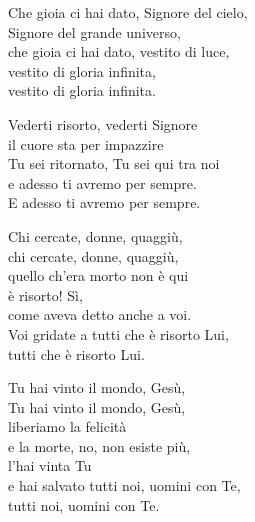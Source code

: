 \documentclass[11pt]{book}
\begin{document}
\congedo

\settowidth{\versewidth}{Che gioia ci hai dato, Signore del cielo,}
\begin{canzone}%
Che gioia ci hai dato, Signore del cielo,\\
Signore del grande universo,\\
che gioia ci hai dato, vestito di luce,\\
vestito di gloria infinita,\\
vestito di gloria infinita.

Vederti risorto, vederti Signore\\
il cuore sta per impazzire\\
Tu sei ritornato, Tu sei qui tra noi\\
e adesso ti avremo per sempre.\\
E adesso ti avremo per sempre.

Chi cercate, donne, quaggiù,\\
chi cercate, donne, quaggiù,\\
quello ch'era morto non è qui\\
è risorto! Sì, \\come aveva detto anche a voi.\\
Voi gridate a tutti che è risorto Lui,\\
tutti che è risorto Lui.

Tu hai vinto il mondo, Gesù,\\
Tu hai vinto il mondo, Gesù,\\
liberiamo la felicità\\
e la morte, no, non esiste più,\\ l'hai vinta Tu\\
e hai salvato tutti noi, uomini con Te,\\
tutti noi, uomini con Te.
\end{canzone}
\end{document}
